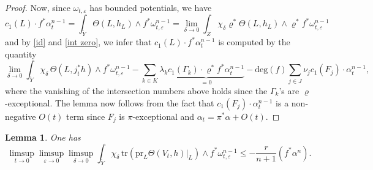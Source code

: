 \documentclass[12pt]{amsart}
\newtheorem{lem}[prop]{Lemma}
\theoremstyle{definition}
\newcommand{\tY}{\widetilde{Y}}
\numberwithin{equation}{section}
\newcommand{\ep}{\varepsilon}
\begin{document}
\begin{proof}
Now, since $\omega_{t,\ep}$ has bounded potentials, we have
\[c_1(L) \cdot f^*\alpha_t^{n-1}=\int_{\tY} \Theta(L,h_L) \wedge f^*\omega_{t,\ep}^{n-1} = \lim_{\delta \to 0} \int_Z \chi_\delta \varrho^*\Theta(L,h_L) \wedge \varrho^*f^*\omega_{t,\ep}^{n-1} \]
and by \eqref{id} and \eqref{int zero}, we infer that $c_1(L) \cdot f^*\alpha_t^{n-1}$ is computed by the quantity
\[\lim_{\delta \to 0} \int_{\tY}\chi_\delta \, \Theta(L, j_t^*h)\wedge f^*\omega_{t,\ep}^{n-1}-\sum_{k\in K} \lambda_k \underbrace{c_1(\Gamma_k) \cdot \varrho^*f^*\alpha_t^{n-1}}_{=0}-\mathrm{deg}(f) \sum_{j\in J} \nu_j c_1(F_j) \cdot \alpha_t^{n-1},\]
where the vanishing of the intersection numbers above holds since the $\Gamma_k$'s are $\varrho$-exceptional. The lemma now follows from the fact that $c_1(F_j) \cdot \alpha_t^{n-1}$ is a non-negative $O(t)$ term since $F_j$ is $\pi$-exceptional and $\alpha_t=\pi^*\alpha+O(t)$. 
\end{proof}

\begin{lem}
\label{lem2}
One has 
\[\limsup_{t\to 0} \limsup_{\ep \to 0} \limsup_{\delta \to 0} \int_{\tY} \chi_\delta \, \mathrm{tr}(\mathrm{pr}_L \Theta(V_t, h)|_L) \wedge f^*\omega_{t,\ep}^{n-1} \le-\frac{r}{n+1}(f^*\alpha^n). \]
\end{lem}
\end{document}
